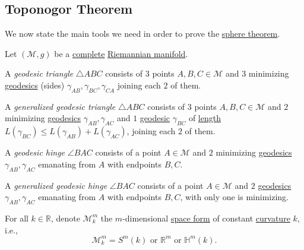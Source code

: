 \subsection{Toponogor Theorem}
We now state the main tools we need in order to prove the \hyperref[thm:sphere]{sphere theorem}.

\begin{definition*}
	Let \((\mathcal{M} , g)\) be a \hyperref[def:geodesically-complete]{complete} \hyperref[def:Riemannian-manifold]{Riemannian manifold}.
	\begin{definition}\label{def:geodesic-triangle}
		A \emph{geodesic triangle} \(\triangle ABC\) consists of \(3\) points \(A, B, C\in \mathcal{M} \) and \(3\) minimizing \hyperref[def:geodesic]{geodesics} (sides) \(\gamma _{AB}, \gamma _{BC}, \gamma _{CA}\) joining each \(2\) of them.
	\end{definition}

	\begin{definition}\label{def:generalized-geodesic-triangle}
		A \emph{generalized geodesic triangle} \(\triangle ABC\) consists of \(3\) points \(A, B, C\in \mathcal{M} \) and \(2\) minimizing \hyperref[def:geodesic]{geodesics} \(\gamma _{AB}, \gamma _{AC}\) and \(1\) \hyperref[def:geodesic]{geodesic} \(\gamma _{BC}\) of \hyperref[def:length]{length} \(L(\gamma _{BC}) \leq L(\gamma _{AB}) + L(\gamma _{AC})\), joining each \(2\) of them.
	\end{definition}

	\begin{definition}\label{def:geodesic-hinge}
		A \emph{geodesic hinge} \(\angle BAC\) consists of a point \(A\in \mathcal{M} \) and \(2\) minimizing \hyperref[def:geodesic]{geodesics} \(\gamma _{AB}, \gamma _{AC}\) emanating from \(A\) with endpoints \(B, C\).
	\end{definition}
	\begin{definition}\label{def:generalized-geodesic-hinge}
		A \emph{generalized geodesic hinge} \(\angle BAC\) consists of a point \(A\in \mathcal{M} \) and \(2\) \hyperref[def:geodesic]{geodesics} \(\gamma _{AB}, \gamma _{AC}\) emanating from \(A\) with endpoints \(B, C\), with only one is minimizing.
	\end{definition}
\end{definition*}

For all \(k\in \mathbb{R} \), denote \(\mathcal{M} _k^m\) the \(m\)-dimensional \hyperref[def:space-form]{space form} of constant \hyperref[def:sectional-curvature]{curvature} \(k\), i.e.,
\[
	\mathcal{M} _k^m = S^m(k) \text{ or } \mathbb{R} ^m \text{ or } \mathbb{H} ^m(k).
\]

